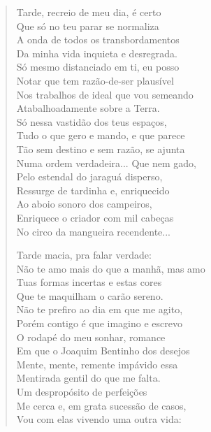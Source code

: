 \begin{verse}
Tarde, recreio de meu dia, é certo\\
Que só no teu parar se normaliza\\
A onda de todos os transbordamentos\\
Da minha vida inquieta e desregrada.\\
Só mesmo distanciado em ti, eu posso\\
Notar que tem razão-de-ser plausível\\
Nos trabalhos de ideal que vou semeando\\
Atabalhoadamente sobre a Terra.\\
Só nessa vastidão dos teus espaços,\\
Tudo o que gero e mando, e que parece\\
Tão sem destino e sem razão, se ajunta\\
Numa ordem verdadeira... Que nem gado,\\
Pelo estendal do jaraguá disperso,\\
Ressurge de tardinha e, enriquecido\\
Ao aboio sonoro dos campeiros,\\
Enriquece o criador com mil cabeças\\
No circo da mangueira recendente...

Tarde macia, pra falar verdade:\\
Não te amo mais do que a manhã, mas amo\\
Tuas formas incertas e estas cores\\
Que te maquilham o carão sereno.\\
Não te prefiro ao dia em que me agito,\\
Porém contigo é que imagino e escrevo\\
O rodapé do meu sonhar, romance\\
Em que o Joaquim Bentinho dos desejos\\
Mente, mente, remente impávido essa\\
Mentirada gentil do que me falta.\\
Um despropósito de perfeições\\
Me cerca e, em grata sucessão de casos,\\
Vou com elas vivendo uma outra vida:


\end{verse}
